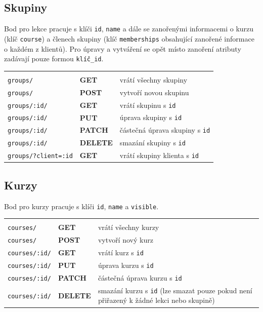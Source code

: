         \subsection{Skupiny}
        Bod pro lekce pracuje s klíči \verb|id|, \verb|name| a dále se zanořenými informacemi o kurzu (klíč \verb|course|) a  členech skupiny (klíč \verb|memberships| obsahující zanořené informace o každém z klientů). Pro úpravy a vytváření se opět místo zanoření atributy zadávají pouze formou \verb|klíč_id|.
        
            {\centering
            \begin{tabular}{p{\apiA\textwidth} p{\apiB\textwidth} p{\apiC\textwidth}}&&\\
                \verb|groups/|              & \textbf{GET}      & vrátí všechny skupiny\\
                \verb|groups/|              & \textbf{POST}     & vytvoří novou skupinu\\
                \verb|groups/:id/|          & \textbf{GET}      & vrátí skupinu s \verb|id|\\
                \verb|groups/:id/|          & \textbf{PUT}      & úprava skupiny s \verb|id|\\
                \verb|groups/:id/|          & \textbf{PATCH}    & částečná úprava skupiny s \verb|id|\\
                \verb|groups/:id/|          & \textbf{DELETE}   & smazání skupiny s \verb|id|\\
                \verb|groups/?client=:id|   & \textbf{GET}      & vrátí skupiny klienta s \verb|id|\\
            \end{tabular}}
        
        \subsection{Kurzy}
        Bod pro kurzy pracuje s klíči \verb|id|, \verb|name| a \verb|visible|.
        
            {\centering
            \begin{tabular}{p{\apiA\textwidth} p{\apiB\textwidth} p{\apiC\textwidth}}&&\\
                \verb|courses/|             & \textbf{GET}      & vrátí všechny kurzy\\
                \verb|courses/|             & \textbf{POST}     & vytvoří nový kurz\\
                \verb|courses/:id/|         & \textbf{GET}      & vrátí kurz s \verb|id|\\
                \verb|courses/:id/|         & \textbf{PUT}      & úprava kurzu s \verb|id|\\
                \verb|courses/:id/|         & \textbf{PATCH}    & částečná úprava kurzu s \verb|id|\\
                \verb|courses/:id/|         & \textbf{DELETE}   & smazání kurzu s \verb|id| (lze smazat pouze pokud není přiřazený k žádné lekci nebo skupině)\\
            \end{tabular}}
            
